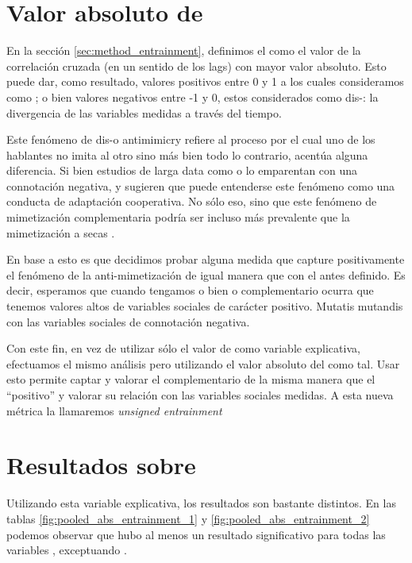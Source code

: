 

\section{Valor absoluto de \entrainment}

En la sección \ref{sec:method_entrainment}, definimos el \entrainment como el valor de la correlación cruzada (en un sentido de los lags) con mayor valor absoluto. Esto puede dar, como resultado, valores positivos entre 0 y 1 a los cuales consideramos como \entrainment; o bien valores negativos entre -1 y 0, estos considerados como dis-\entrainment: la divergencia de las variables \ap medidas a través del tiempo.

Este fenómeno de dis-\entrainment o antimimicry \cite{CHAR1999} refiere al proceso por el cual uno de los hablantes no imita al otro sino más bien todo lo contrario, acentúa alguna diferencia. Si bien estudios de larga data como \cite{bourhis1973language} o \cite{dabbs1969similarity} lo emparentan con una connotación negativa, \cite{healey2014divergence} y \cite{levitan2015acoustic} sugieren que puede entenderse este fenómeno como una conducta de adaptación cooperativa. No sólo eso, sino que este fenómeno de mimetización complementaria podría ser incluso más prevalente que la mimetización a secas \cite{levitan2015acoustic}.

En base a esto es que decidimos probar alguna medida que capture positivamente el fenómeno de la anti-mimetización de igual manera que con el \entrainment antes definido. Es decir, esperamos que cuando tengamos o bien \entrainment o \entrainment complementario ocurra que tenemos valores altos de variables sociales de carácter positivo. Mutatis mutandis con las variables sociales de connotación negativa.

Con este fin, en vez de utilizar sólo el valor de \entrainment como variable explicativa, efectuamos el mismo análisis pero utilizando el valor absoluto del \entrainment como tal. Usar esto permite captar y valorar el \entrainment complementario de la misma manera que el ``positivo'' y valorar su relación con las variables sociales medidas. A esta nueva métrica la llamaremos \emph{unsigned entrainment}

\section{Resultados sobre \absentrainment}

Utilizando esta variable explicativa, los resultados son bastante distintos. En las tablas \ref{fig:pooled_abs_entrainment_1} y \ref{fig:pooled_abs_entrainment_2} podemos observar que hubo al menos un resultado significativo para todas las variables \ap, exceptuando \PHONAVG.

